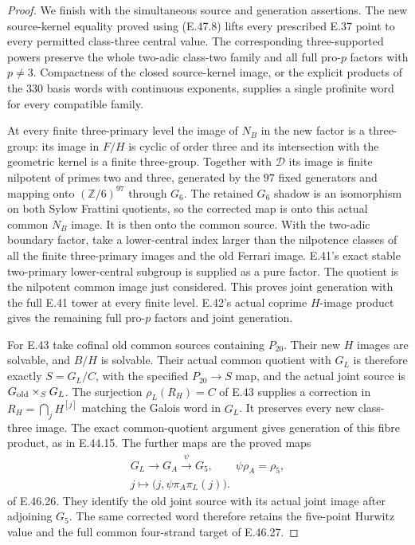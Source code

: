 \begin{proof}
We finish with the simultaneous source and
generation assertions.  The new source-kernel
equality proved using \textup{(E.47.8)} lifts
every prescribed E.37 point to every permitted
class-three central value.  The corresponding
three-supported powers preserve the whole
two-adic class-two family and all full pro-$p$
factors with $p\ne3$.  Compactness of the closed
source-kernel image, or the explicit products
of the $330$ basis words with continuous
exponents, supplies a single profinite word
for every compatible family.

At every finite three-primary level the image
of $N_B$ in the new factor is a three-group:
its image in $F/H$ is cyclic of order three
and its intersection with the geometric
kernel is a finite three-group.  Together
with $\mathscr D$ its image is finite nilpotent
of primes two and three, generated by the
$97$ fixed generators and mapping onto
$(\mathbb Z/6)^{97}$ through $G_6$.
The retained $G_6$ shadow is an isomorphism
on both Sylow Frattini quotients, so the
corrected map is onto this actual common
$N_B$ image.  It is then onto the common
source.  With the two-adic boundary factor,
take a lower-central index larger than the
nilpotence classes of all the finite
three-primary images and the old Ferrari
image.  E.41's exact stable two-primary
lower-central subgroup is supplied as a
pure factor.  The quotient is the nilpotent
common image just considered.  This proves
joint generation with the full E.41 tower
at every finite level.  E.42's actual
coprime $H$-image product gives the remaining
full pro-$p$ factors and joint generation.

For E.43 take cofinal old common sources
containing $P_{20}$.  Their new $H$ images
are solvable, and $B/H$ is solvable.  Their
actual common quotient with $G_L$ is therefore
exactly $S=G_L/C$, with the specified
$P_{20}\to S$ map, and the actual joint
source is $G_{\rm old}\times_SG_L$.
The surjection $\rho_L(R_H)=C$ of E.43
supplies a correction in
$R_H=\bigcap_jH^{[j]}$ matching the Galois
word in $G_L$.  It preserves every new
class-three image.  The exact common-quotient
argument gives generation of this fibre
product, as in E.44.15.
The further maps are the proved maps
\[
 \begin{gathered}
 G_L\longrightarrow G_A\xrightarrow{\psi}G_5,
 \qquad \psi\rho_A=\rho_5,
 \\
 j\longmapsto\bigl(j,\psi\pi_A\pi_L(j)\bigr).
 \end{gathered}
 \tag{E.47.25}
\]
of E.46.26.  They identify the old joint
source with its actual joint image after
adjoining $G_5$.  The same corrected word
therefore retains the five-point Hurwitz
value and the full common four-strand
target of E.46.27.


\end{proof}
